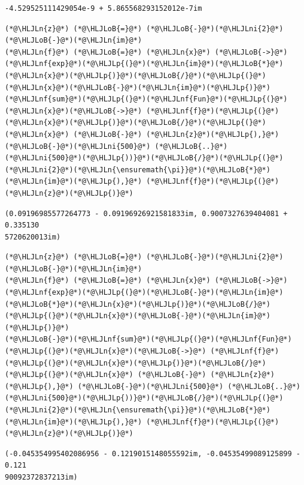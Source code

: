 \documentclass[12pt,a4paper]{article}
\newcommand{\HLJLn}[1]{#1}
\newcommand{\HLJLnf}[1]{\textcolor[RGB]{66,102,213}{#1}}
\newcommand{\HLJLni}[1]{\textcolor[RGB]{59,151,46}{#1}}
\newcommand{\HLJLoB}[1]{\textcolor[RGB]{102,102,102}{\textbf{#1}}}
\newcommand{\HLJLp}[1]{#1}
\begin{document}
\begin{lstlisting}
-4.529525111429054e-9 + 5.865568293152012e-7im
\end{lstlisting}


\begin{lstlisting}
(*@\HLJLn{z}@*) (*@\HLJLoB{=}@*) (*@\HLJLoB{-}@*)(*@\HLJLni{2}@*)(*@\HLJLoB{-}@*)(*@\HLJLn{im}@*)
(*@\HLJLn{f}@*) (*@\HLJLoB{=}@*) (*@\HLJLn{x}@*) (*@\HLJLoB{->}@*) (*@\HLJLnf{exp}@*)(*@\HLJLp{(}@*)(*@\HLJLn{im}@*)(*@\HLJLoB{*}@*)(*@\HLJLn{x}@*)(*@\HLJLp{)}@*)(*@\HLJLoB{/}@*)(*@\HLJLp{(}@*)(*@\HLJLn{x}@*)(*@\HLJLoB{-}@*)(*@\HLJLn{im}@*)(*@\HLJLp{)}@*)
(*@\HLJLnf{sum}@*)(*@\HLJLp{(}@*)(*@\HLJLnf{Fun}@*)(*@\HLJLp{(}@*)(*@\HLJLn{x}@*)(*@\HLJLoB{->}@*) (*@\HLJLnf{f}@*)(*@\HLJLp{(}@*)(*@\HLJLn{x}@*)(*@\HLJLp{)}@*)(*@\HLJLoB{/}@*)(*@\HLJLp{(}@*)(*@\HLJLn{x}@*) (*@\HLJLoB{-}@*) (*@\HLJLn{z}@*)(*@\HLJLp{),}@*) (*@\HLJLoB{-}@*)(*@\HLJLni{500}@*) (*@\HLJLoB{..}@*) (*@\HLJLni{500}@*)(*@\HLJLp{))}@*)(*@\HLJLoB{/}@*)(*@\HLJLp{(}@*)(*@\HLJLni{2}@*)(*@\HLJLn{\ensuremath{\pi}}@*)(*@\HLJLoB{*}@*)(*@\HLJLn{im}@*)(*@\HLJLp{),}@*) (*@\HLJLnf{f}@*)(*@\HLJLp{(}@*)(*@\HLJLn{z}@*)(*@\HLJLp{)}@*)
\end{lstlisting}

\begin{lstlisting}
(0.09196985577264773 - 0.09196926921581833im, 0.9007327639404081 + 0.335130
5720620013im)
\end{lstlisting}


\begin{lstlisting}
(*@\HLJLn{z}@*) (*@\HLJLoB{=}@*) (*@\HLJLoB{-}@*)(*@\HLJLni{2}@*)(*@\HLJLoB{-}@*)(*@\HLJLn{im}@*)
(*@\HLJLn{f}@*) (*@\HLJLoB{=}@*) (*@\HLJLn{x}@*) (*@\HLJLoB{->}@*) (*@\HLJLnf{exp}@*)(*@\HLJLp{(}@*)(*@\HLJLoB{-}@*)(*@\HLJLn{im}@*)(*@\HLJLoB{*}@*)(*@\HLJLn{x}@*)(*@\HLJLp{)}@*)(*@\HLJLoB{/}@*)(*@\HLJLp{(}@*)(*@\HLJLn{x}@*)(*@\HLJLoB{-}@*)(*@\HLJLn{im}@*)(*@\HLJLp{)}@*)
(*@\HLJLoB{-}@*)(*@\HLJLnf{sum}@*)(*@\HLJLp{(}@*)(*@\HLJLnf{Fun}@*)(*@\HLJLp{(}@*)(*@\HLJLn{x}@*)(*@\HLJLoB{->}@*) (*@\HLJLnf{f}@*)(*@\HLJLp{(}@*)(*@\HLJLn{x}@*)(*@\HLJLp{)}@*)(*@\HLJLoB{/}@*)(*@\HLJLp{(}@*)(*@\HLJLn{x}@*) (*@\HLJLoB{-}@*) (*@\HLJLn{z}@*)(*@\HLJLp{),}@*) (*@\HLJLoB{-}@*)(*@\HLJLni{500}@*) (*@\HLJLoB{..}@*) (*@\HLJLni{500}@*)(*@\HLJLp{))}@*)(*@\HLJLoB{/}@*)(*@\HLJLp{(}@*)(*@\HLJLni{2}@*)(*@\HLJLn{\ensuremath{\pi}}@*)(*@\HLJLoB{*}@*)(*@\HLJLn{im}@*)(*@\HLJLp{),}@*) (*@\HLJLnf{f}@*)(*@\HLJLp{(}@*)(*@\HLJLn{z}@*)(*@\HLJLp{)}@*)
\end{lstlisting}

\begin{lstlisting}
(-0.045354995402086956 - 0.1219015148055592im, -0.04535499089125899 - 0.121
90092372837213im)
\end{lstlisting}
\end{document}
